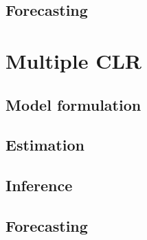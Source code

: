 \documentclass[
]{book}
\begin{document}
\hypertarget{forecasting}{%
\subsection{Forecasting}\label{forecasting}}

\hypertarget{multiple-clr}{%
\section{Multiple CLR}\label{multiple-clr}}

\hypertarget{model-formulation-1}{%
\subsection{Model formulation}\label{model-formulation-1}}

\hypertarget{estimation-1}{%
\subsection{Estimation}\label{estimation-1}}

\hypertarget{inference-1}{%
\subsection{Inference}\label{inference-1}}

\hypertarget{forecasting-1}{%
\subsection{Forecasting}\label{forecasting-1}}

  
\end{document}
